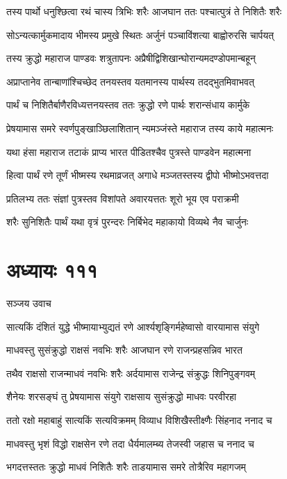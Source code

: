 \twolineshloka
{तस्य पार्थो धनुश्छित्वा रथं चास्य त्रिभिः शरैः}
{आजघान ततः पश्चात्पुत्रं ते निशितैः शरैः}


\twolineshloka
{सोऽन्यत्कार्मुकमादाय भीमस्य प्रमुखे स्थितः}
{अर्जुनं पञ्चाविंशत्या बाह्वोरुरसि चार्पयत्}


\twolineshloka
{तस्य क्रुद्धो महाराज पाण्डवः शत्रुतापनः}
{अप्रैषीद्विशिखान्घोरान्यमदण्डोपमान्बहून्}


\twolineshloka
{अप्राप्तानेव तान्बाणांश्चिच्छेद तनयस्तव}
{यतमानस्य पार्थस्य तदद्भुतमिवाभवत्}


\twolineshloka
{पार्थं च निशितैर्बाणैरविध्यत्तनयस्तव}
{ततः क्रुद्धो रणे पार्थः शरान्संधाय कार्मुके}


\twolineshloka
{प्रेषयामास समरे स्वर्णपुङ्खाञ्छिलाशितान्}
{न्यमञ्जंस्ते महाराज तस्य काये महात्मनः}


\twolineshloka
{यथा हंसा महाराज तटाकं प्राप्य भारत}
{पीडितश्चैव पुत्रस्ते पाण्डवेन महात्मना}


\twolineshloka
{हित्वा पार्थं रणे तूर्णं भीष्मस्य रथमाव्रजत्}
{अगाधे मञ्जतस्तस्य द्वीपो भीष्मोऽभवत्तदा}


\twolineshloka
{प्रतिलभ्य ततः संज्ञां पुत्रस्तव विशांपते}
{अवारयत्ततः शूरो भूय एव पराक्रमी}


\twolineshloka
{शरैः सुनिशितैः पार्थं यथा वृत्रं पुरन्दरः}
{निर्बिभेद महाकायो विव्यथे नैव चार्जुनः}


\chapter{अध्यायः १११}
\twolineshloka
{सञ्जय उवाच}
{}


\twolineshloka
{सात्यकिं दंशितं युद्धे भीष्मायाभ्युद्यतं रणे}
{आर्श्यशृङ्गिर्महेष्वासो वारयामास संयुगे}


\twolineshloka
{माधवस्तु सुसंक्रुद्धो राक्षसं नवभिः शरैः}
{आजघान रणे राजन्प्रहसन्निव भारत}


\twolineshloka
{तथैव राक्षसो राजन्माधवं नवभिः शरैः}
{अर्दयामास राजेन्द्र संक्रुद्धः शिनिपुङ्गवम्}


\twolineshloka
{शैनेयः शरसङ्घं तु प्रेषयामास संयुगे}
{राक्षसाय सुसंक्रुद्धो माधवः परवीरहा}


\twolineshloka
{ततो रक्षो महाबाहुं सात्यकिं सत्यविक्रमम्}
{विव्याध विशिखैस्तीक्ष्णैः सिंहनाद ननाद च}


\twolineshloka
{माधवस्तु भृशं विद्धो राक्षसेन रणे तदा}
{धैर्यमालम्ब्य तेजस्वी जहास च ननाद च}


\twolineshloka
{भगदत्तस्ततः क्रुद्धो माधवं निशितैः शरैः}
{ताडयामास समरे तोत्रैरिव महागजम्}


